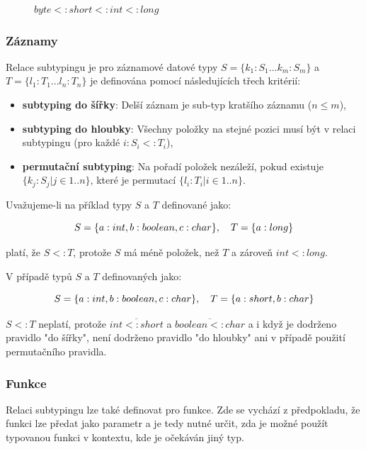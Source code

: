 \documentclass[czech,DP]{thesiskiv}
\begin{document}
\begin{figure}[h]
	\centering
	$byte <: short <: int <: long$
\end{figure}

\subsubsection{Záznamy}

Relace subtypingu je pro záznamové datové typy $S = \{k_1:S_1 ... k_m:S_m\}$ a $T = \{l_1:T_1 ... l_n:T_n\}$ je definována pomocí následujících třech kritérií:

\begin{itemize}
	\item \textbf{subtyping do šířky}: Delší záznam je sub-typ kratšího záznamu ($n \le m$),
	\item \textbf{subtyping do hloubky}: Všechny položky na stejné pozici musí být v relaci subtypingu (pro každé $i : S_i <: T_i$),
	\item \textbf{permutační subtyping}: Na pořadí položek nezáleží, pokud existuje $\{k_j:S_j | j \in 1..n \}$, které je permutací $\{l_i:T_i | i \in 1..n \}$.
\end{itemize}

Uvažujeme-li na příklad typy $S$ a $T$ definované jako:

\begin{equation}
\centering
	S = \{a:int, b:boolean, c:char\}, \quad
	T = \{a:long\}
\end{equation}

 platí, že $S <: T$, protože $S$ má méně položek, než $T$ a zároveň $int <: long$. 
 
 V případě typů $S$ a $T$ definovaných jako:
 
\begin{equation}
	\centering
	S = \{a:int, b:boolean, c:char\}, \quad
	 T = \{a:short, b:char\}
\end{equation} 

 $S <: T$ neplatí, protože $\overline{int <: short}$ a $\overline{boolean <: char}$ a i když je dodrženo pravidlo "do šířky", není dodrženo pravidlo "do hloubky" ani v případě použití permutačního pravidla.

\subsubsection{Funkce}

Relaci subtypingu lze také definovat pro funkce. Zde se vychází z předpokladu, že funkci lze předat jako parametr a je tedy nutné určit, zda je možné použít typovanou funkci v kontextu, kde je očekáván jiný typ. 
\end{document}
